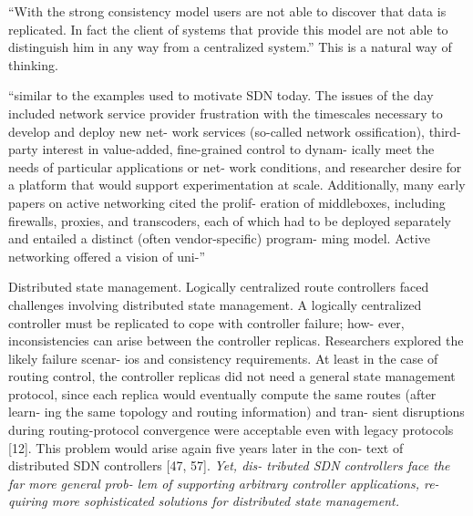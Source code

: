 ``With the strong consistency model users are not able to discover that data is replicated. In fact the client of systems that provide this model are not able to distinguish him in any way from a centralized system.'' This is a natural way of thinking. 

``similar to the examples used to motivate SDN today. The issues of the day included network service provider frustration with the timescales necessary to develop and deploy new net- work services (so-called network ossification), third-party interest in value-added, fine-grained control to dynam- ically meet the needs of particular applications or net- work conditions, and researcher desire for a platform that would support experimentation at scale. Additionally, many early papers on active networking cited the prolif- eration of middleboxes, including firewalls, proxies, and transcoders, each of which had to be deployed separately and entailed a distinct (often vendor-specific) program- ming model. Active networking offered a vision of uni-''






Distributed state management. Logically centralized route controllers faced challenges involving distributed state management. A logically centralized controller must be replicated to cope with controller failure; how- ever, inconsistencies can arise between the controller replicas. Researchers explored the likely failure scenar- ios and consistency requirements. At least in the case of routing control, the controller replicas did not need a general state management protocol, since each replica would eventually compute the same routes (after learn- ing the same topology and routing information) and tran- sient disruptions during routing-protocol convergence were acceptable even with legacy protocols [12]. This problem would arise again five years later in the con- text of distributed SDN controllers [47, 57]. \emph{Yet, dis- tributed SDN controllers face the far more general prob- lem of supporting arbitrary controller applications, re- quiring more sophisticated solutions for distributed state management.}

